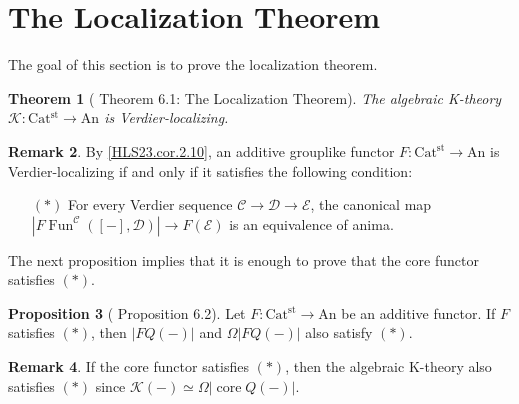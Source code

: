 \documentclass[a4paper,dvipdfmx,11pt,reqno]{amsart}
\DeclareMathOperator{\Fun}{Fun}
\newcommand{\C}{\mathcal{C}}
\newcommand{\D}{\mathcal{D}}
\newcommand{\E}{\mathcal{E}}
\newcommand{\I}{\mathcal{I}}
\newcommand{\K}{\mathcal{K}}
\DeclareMathOperator{\core}{core}
\DeclareMathOperator{\asscat}{asscat}
\DeclareMathOperator{\Span}{Span}
\newcommand{\An}{\mathrm{An}}
\newcommand{\Catst}{\mathrm{Cat^{st}}}
\newcommand{\Sp}{\mathrm{Sp}}
\newtheorem{theorem}{Theorem}[section]
\theoremstyle{definition}
\newtheorem{lemma}[theorem]{Lemma}
\newtheorem{proposition}[theorem]{Proposition}
\newtheorem{remark}[theorem]{Remark}
\begin{document}
\section{The Localization Theorem}

The goal of this section is to prove the localization theorem.

\begin{theorem}[\cite{HLS23} Theorem 6.1: The Localization Theorem] \label{thrm.localization_theorem}
  The algebraic K-theory $\K : \Catst \to \An$ is Verdier-localizing.
\end{theorem}

\begin{remark}
  By \cref{HLS23.cor.2.10}, an additive grouplike functor $F : \Catst \to \An$ is Verdier-localizing if and only if it satisfies the following condition:
  \begin{itemize}
    \item[$(\ast)$] For every Verdier sequence $\C \to \D \to \E$, the canonical map $|F\Fun^{\C}([-],\D)| \to F(\E)$ is an equivalence of anima.
  \end{itemize}
\end{remark}

The next proposition implies that it is enough to prove that the core functor satisfies $(\ast)$.

\begin{proposition}[\cite{HLS23} Proposition 6.2] \label{HLS23.prop.6.2} 
  Let $F : \Catst \to \An$ be an additive functor.
  If $F$ satisfies $(\ast)$, then $|FQ(-)|$ and $\Omega|FQ(-)|$ also satisfy $(\ast)$.
\end{proposition}

\begin{remark}
  If the core functor satisfies $(\ast)$, then the algebraic K-theory also satisfies $(\ast)$ since $\K(-) \simeq \Omega|\core Q(-)|$.
\end{remark}


\end{document}
